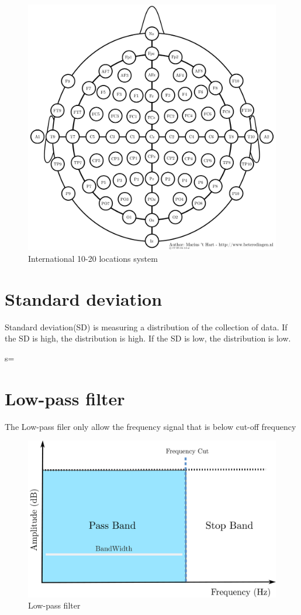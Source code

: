 \begin{figure}[ht]
	\centering
	\includegraphics[scale = 0.5]{chapter3/35.pdf}
	\caption{International 10-20 locations system\cite{ref15}}
\end{figure}

\newpage
\section{Standard deviation}
\hspace{1.5cm} Standard deviation(SD) is measuring a distribution of the collection of data. If the SD is high, the distribution is high. If the SD is low, the distribution is low.

s=

\section{Low-pass filter}
\hspace{1.5cm}The Low-pass filer only allow the frequency signal that is below  cut-off frequency
\begin{figure}[ht]
	\centering
	\includegraphics[scale = 0.14]{chapter3/lowpass.pdf}
	\caption{Low-pass filter}
\end{figure}

